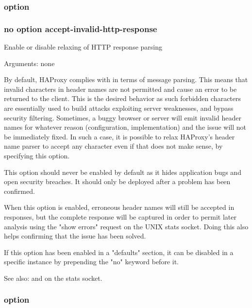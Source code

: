 \subsubsection[accept-invalid-http-response]{option }
\subsubsection*{no option accept-invalid-http-response}

  
  Enable or disable relaxing of HTTP response parsing


  Arguments: none

  By default, HAProxy complies with  in terms of message parsing. This
  means that invalid characters in header names are not permitted and cause an
  error to be returned to the client. This is the desired behavior as such
  forbidden characters are essentially used to build attacks exploiting server
  weaknesses, and bypass security filtering. Sometimes, a buggy browser or
  server will emit invalid header names for whatever reason (configuration,
  implementation) and the issue will not be immediately fixed. In such a case,
  it is possible to relax HAProxy's header name parser to accept any character
  even if that does not make sense, by specifying this option.

  This option should never be enabled by default as it hides application bugs
  and open security breaches. It should only be deployed after a problem has
  been confirmed.

  When this option is enabled, erroneous header names will still be accepted in
  responses, but the complete response will be captured in order to permit
  later analysis using the "show errors" request on the UNIX stats socket.
  Doing this also helps confirming that the issue has been solved.

  If this option has been enabled in a "defaults" section, it can be disabled
  in a specific instance by prepending the "no" keyword before it.

  See also:  and  on the
             stats socket.

\subsubsection[allbackups]{option }
